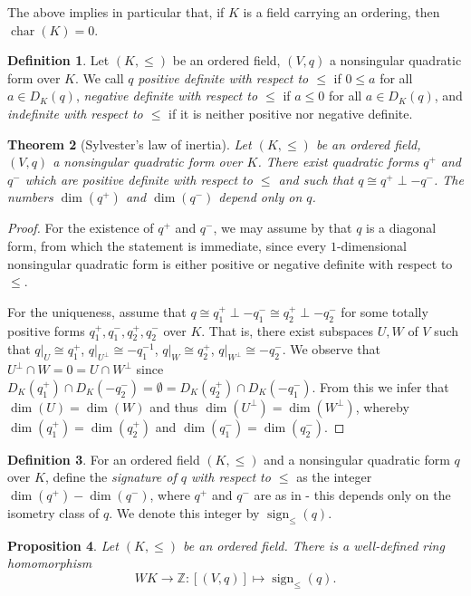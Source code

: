 \documentclass[12pt, leqno, british]{amsart}
\theoremstyle{definition}
\newtheorem{defi}{Definition}[subsection]
\theoremstyle{plain}
\newtheorem{prop}[defi]{Proposition}
\newtheorem{thm}[defi]{Theorem}
\theoremstyle{remark}
\newcommand{\mbb}{\mathbb}
\newcommand{\zz}{\mbb Z}
\DeclareMathOperator{\charac}{char}
\DeclareMathOperator{\sign}{sign}
\begin{document}
The above implies in particular that, if $K$ is a field carrying an ordering, then $\charac(K) = 0$.
\begin{defi}
Let $(K, \leq)$ be an ordered field, $(V, q)$ a nonsingular quadratic form over $K$.
We call $q$ \emph{positive definite with respect to $\leq$} if $0 \leq a$ for all $a \in D_K(q)$, \emph{negative definite with respect to $\leq$} if $a \leq 0$ for all $a \in D_K(q)$, and \emph{indefinite with respect to $\leq$} if it is neither positive nor negative definite.
\end{defi}
\begin{thm}[Sylvester's law of inertia]\label{T:Sylvester}
Let $(K, \leq)$ be an ordered field, $(V, q)$ a nonsingular quadratic form over $K$.
There exist quadratic forms $q^+$ and $q^-$ which are positive definite with respect to $\leq$ and such that $q \cong q^+ \perp -q^-$.
The numbers $\dim(q^+)$ and $\dim(q^-)$ depend only on $q$.
\end{thm}
\begin{proof}
For the existence of $q^+$ and $q^-$, we may assume by  that $q$ is a diagonal form, from which the statement is immediate, since every $1$-dimensional nonsingular quadratic form is either positive or negative definite with respect to $\leq$.

For the uniqueness, assume that $q \cong q^+_1 \perp -q^-_1 \cong q^+_2 \perp -q^-_2$ for some totally positive forms $q^+_1, q^-_1, q^+_2, q^-_2$ over $K$.
That is, there exist subspaces $U, W$ of $V$ such that $q\vert_U \cong q^+_1$, $q\vert_{U^\perp} \cong -q^{-1}_1$, $q\vert_W \cong q^+_2$, $q\vert_{W^\perp} \cong -q^-_2$.
We observe that $U^\perp \cap W = 0 = U \cap W^\perp$ since $D_{K}(q^+_1) \cap D_{K}(-q^-_2) = \emptyset = D_{K}(q^+_2) \cap D_{K}(-q^-_1)$.
From this we infer that $\dim(U) = \dim(W)$ and thus $\dim(U^\perp) = \dim(W^\perp)$, whereby $\dim(q^+_1) = \dim(q^+_2)$ and $\dim(q^-_1) = \dim(q^-_2)$.
\end{proof}
\begin{defi}
For an ordered field $(K, \leq)$ and a nonsingular quadratic form $q$ over $K$, define the \emph{signature of $q$ with respect to $\leq$} as the integer $\dim(q^+)-\dim(q^-)$, where $q^+$ and $q^-$ are as in  - this depends only on the isometry class of $q$.
We denote this integer by $\sign_\leq(q)$.
\end{defi}
\begin{prop}\label{P:signature-homomorphism}
Let $(K, \leq)$ be an ordered field.
There is a well-defined ring homomorphism
$$ WK \to \zz : [(V, q)] \mapsto \sign_\leq(q). $$
\end{prop}
\end{document}
